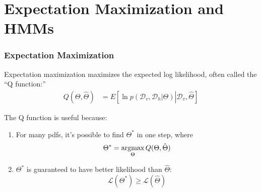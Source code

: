 \documentclass{beamer}
\newcommand{\argmax}{\operatornamewithlimits{argmax}}
\begin{document}
\section[HMM]{Expectation Maximization and HMMs}
\setcounter{subsection}{1}

\begin{frame}
  \frametitle{Expectation Maximization}

  Expectation maximization maximizes the expected log likelihood,
  often called the ``Q function:''
  \begin{align*}
    Q(\Theta,\hat\Theta) 
    &= E\left[\ln p({\mathcal D}_v,{\mathcal D}_h|\Theta)\left|{\mathcal D}_v,\hat\Theta\right.\right]
  \end{align*}

  The Q function is useful because:
  \begin{enumerate}
  \item For many pdfs, it's possible to find $\Theta^*$ in one step, where
    \begin{displaymath}
      \Theta^* = \argmax_\Theta Q(\Theta,\hat\Theta)
    \end{displaymath}
  \item $\Theta^*$ is guaranteed to have better likelihood than $\hat\Theta$:
    \begin{displaymath}
      {\mathcal L}(\Theta^*) \ge {\mathcal L}(\hat\Theta)
    \end{displaymath}
  \end{enumerate}
\end{frame}
\end{document}
